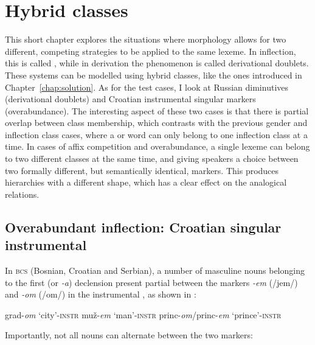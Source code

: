 \chapter{Hybrid classes}\label{chap:hybrid}

This short chapter explores the situations where morphology allows for two different, competing strategies to be applied to the same lexeme. In inflection, this is called , while in derivation the phenomenon is called derivational  doublets. These systems can be modelled using hybrid classes, like the ones introduced in Chapter~\ref{chap:solution}. As for the test cases, I look at Russian diminutives (derivational doublets) and Croatian instrumental singular markers (overabundance). The interesting aspect of these two cases is that there is partial overlap between class membership, which contrasts with the previous gender and inflection class cases, where a  or word can only belong to one inflection class at a time. In cases of affix competition and overabundance, a single lexeme can belong to two different classes at the same time, and giving speakers a choice between two formally different, but semantically identical, markers. This produces hierarchies with a different shape, which has a clear effect on the analogical relations.

\section{Overabundant inflection: Croatian singular instrumental}

In \textsc{bcs} (Bosnian, Croatian and Serbian), a number of masculine nouns belonging to the first (or \textit{-a}) declension present partial  between the markers \textit{-em} (/jem/) and \textit{-om} (/om/) in the instrumental , as shown in :

\begin{exe}
    \ex \label{exe-over-croat}
    \begin{xlist}
        \ex grad-\textit{om} `city'-\textsc{instr}
        \ex muž-\textit{em} `man'-\textsc{instr}
        \ex princ-\textit{om}/princ-\textit{em} `prince'-\textsc{instr}
    \end{xlist}
\end{exe}

Importantly, not all nouns can alternate between the two markers:

